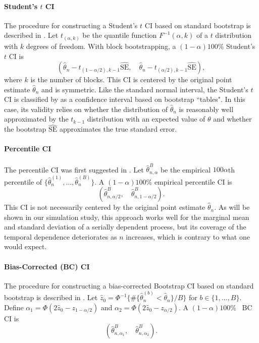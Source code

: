 \documentclass[10pt]{article}
\newcommand{\eds}[1]{\textcolor{red}{EDS: (#1)}}
\newcommand{\mc}[1]{\textcolor{orange}{MC: (#1)}}
\begin{document}
\paragraph{Student's $t$ CI}
The procedure for constructing a Student's $t$ CI based on standard bootstrap is 
described in \citet{efron1993introduction}. Let $t_{(\alpha, k)}$ be the 
quantile function $F^{-1}(\alpha, k)$ of a $t$ distribution with $k$ degrees of 
freedom. With 
block bootstrapping, 
a $(1 - \alpha)100\%$ Student's $t$ CI is
\[
(\hat{\theta}_{n} - t_{(1-\alpha/2), k - 1}\widehat{\text{SE}}, \quad
\hat{\theta}_{n} - t_{(\alpha/2), k -1}\widehat{\text{SE}}),
\]
where $k$ is the number of blocks. This CI is centered by the original point 
estimate $\hat\theta_n$ and is symmetric. Like the standard normal interval, the
Student's $t$ CI is classified by \citet{efron1993introduction} 
as a confidence interval based on bootstrap ``tables". In this case, its 
validity relies on whether the distribution of $\hat\theta_n$ is reasonably well 
approximated by the $t_{k-1}$ distribution with an expected value of $\theta$ 
and whether the bootstrap $\widehat{\text{SE}}$ approximates the true standard 
error.


\paragraph{Percentile CI}
The percentile CI was first suggested in \citet{efron1979bootstrap}.
Let $\hat\theta_{n, \alpha}^B$ be the empirical $100\alpha$th percentile of
$\{\hat\theta_n^{(1)}, \ldots, \hat\theta_n^{(B)}\}$. 
A $(1 - \alpha)100\%$ empirical percentile CI is
\[
(\hat\theta_{n, \alpha/2}^{B}, \quad \hat\theta_{n, 1 - \alpha/2}^{B}).
\]
This CI is not necessarily centered by the original point estimate 
$\hat\theta_n$. As will be shown in our simulation study, this approach works 
well for the marginal mean and standard deviation of a serially dependent 
process, but its coverage of the temporal dependence deteriorates as $n$ 
increases, which is contrary to what one would expect.


\paragraph{Bias-Corrected (BC) CI}
The procedure for constructing a bias-corrected Bootstrap CI based on standard
bootstrap is described in \citet{carpenter2000bootstrap}. Let
$\hat{z}_0 = \Phi^{-1}\{\#\{\hat\theta_n^{(b)} < \hat{\theta}_n\} / B\}$ for
$b \in \{1, \ldots, B\}$. Define 
$\alpha_1 = \Phi(2\hat{z}_0 - z_{1 - \alpha/2})$ 
and $\alpha_2 = \Phi(2\hat{z}_0 - z_{\alpha/2})$. 
A $(1 - \alpha)100\%$ ~BC CI is
\[
(\hat\theta_{n, \alpha_1}^{B}, \quad \hat\theta_{n, \alpha_2}^{B}).
\]
\end{document}
